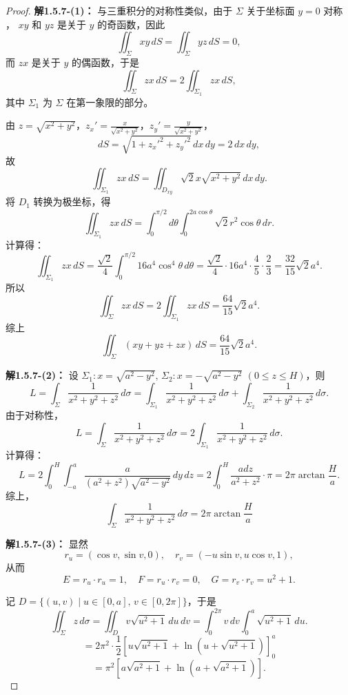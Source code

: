 \documentclass[12pt]{ctexart}
\begin{document}
\begin{proof}
	\textbf{解1.5.7-(1)：} 与三重积分的对称性类似，由于 $\Sigma$ 关于坐标面 $y = 0$ 对称 ，
$xy$ 和 $yz$ 是关于 $y$ 的奇函数，因此
\[
\iint_\Sigma xy \, dS = \iint_\Sigma yz \, dS = 0,
\]
而 $zx$ 是关于 $y$ 的偶函数，于是
\[
\iint_\Sigma zx \, dS = 2 \iint_{\Sigma_1} zx \, dS,
\]
其中 $\Sigma_1$ 为 $\Sigma$ 在第一象限的部分。

由 $z = \sqrt{x^2 + y^2}$，$z_x' = \frac{x}{\sqrt{x^2 + y^2}}$，$z_y' = \frac{y}{\sqrt{x^2 + y^2}}$，
\[
dS = \sqrt{1 + z_x'^2 + z_y'^2} \, dx \, dy = 2 \, dx \, dy,
\]
故
\[
\iint_{\Sigma_1} zx \, dS = \iint_{D_{xy}} \sqrt{2} x \sqrt{x^2 + y^2} \, dx \, dy.
\]
将 $D_1$ 转换为极坐标，得
\[
\iint_{\Sigma_1} zx \, dS = \int_0^{\pi/2} d\theta \int_0^{2a \cos\theta} \sqrt{2} r^2 \cos\theta \, dr.
\]
计算得：
\[
\iint_{\Sigma_1} zx \, dS = \frac{\sqrt{2}}{4} \int_0^{\pi/2} 16a^4 \cos^4\theta \, d\theta
= \frac{\sqrt{2}}{4} \cdot 16a^4 \cdot \frac{4}{5} \cdot \frac{2}{3}= \frac{32}{15} \sqrt{2} a^4.
\]
所以
\[
\iint_\Sigma zx \, dS = 2 \iint_{\Sigma_1} zx \, dS = \frac{64}{15} \sqrt{2} a^4.
\]
综上
\[
\iint_\Sigma (xy + yz + zx) \, dS = \frac{64}{15} \sqrt{2} a^4.
\]

\textbf{解1.5.7-(2)：} 设 $\Sigma_1: x = \sqrt{a^2 - y^2}$, $\Sigma_2: x = -\sqrt{a^2 - y^2}$ $(0 \leq z \leq H)$，则
\[
L = \int_\Sigma \frac{1}{x^2 + y^2 + z^2} \, d\sigma 
= \int_{\Sigma_1} \frac{1}{x^2 + y^2 + z^2} \, d\sigma 
+ \int_{\Sigma_2} \frac{1}{x^2 + y^2 + z^2} \, d\sigma.
\]
由于对称性，
\[
L = \int_\Sigma \frac{1}{x^2 + y^2 + z^2} \, d\sigma 
= 2 \int_{\Sigma_1} \frac{1}{x^2 + y^2 + z^2} \, d\sigma .
\]
计算得：
\[
L = 2 \int_0^H \int_{-a}^a \frac{a}{(a^2 + z^2)\sqrt{a^2 - y^2}} \, dy \, dz = 2 \int_0^H \frac{adz}{a^2 + z^2} \cdot \pi = 2\pi \arctan \frac{H}{a} .
\]
综上，
\[
\int_\Sigma \frac{1}{x^2 + y^2 + z^2} \, d\sigma = 2\pi \arctan \frac{H}{a}
\]

\textbf{解1.5.7-(3)：} 显然
\[
r_u = (\cos v, \sin v, 0), \quad r_v = (-u \sin v, u \cos v, 1),
\]
从而
\[
E = r_u \cdot r_u = 1, \quad F = r_u \cdot r_v = 0, \quad G = r_v \cdot r_v = u^2 + 1.
\]

记 $D = \{ (u, v) \mid u \in [0, a], \, v \in [0, 2\pi] \}$，于是
\[
\iint_\Sigma z \, d\sigma = \iint_D v \sqrt{u^2 + 1} \, du \, dv 
                    = \int_0^{2\pi} v \, dv \int_0^a \sqrt{u^2 + 1} \, du.
\]
\[
                    = 2\pi^2 \cdot \frac{1}{2} \left[ u \sqrt{u^2 + 1} + \ln(u + \sqrt{u^2 + 1}) \right]_0^a
\]
\[
                    = \pi^2 \left[ a \sqrt{a^2 + 1} + \ln(a + \sqrt{a^2 + 1}) \right].
\]

\end{proof}
\end{document}
